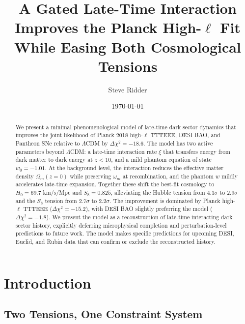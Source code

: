 \documentclass[twocolumn,showpacs,preprintnumbers,amsmath,amssymb,prd]{revtex4-2}
\begin{document}

\title{A Gated Late-Time Interaction Improves the Planck High-$\ell$ Fit While Easing Both Cosmological Tensions}

\author{Steve Ridder}

\date{\today}

\begin{abstract}
We present a minimal phenomenological model of late-time dark sector dynamics that improves the joint likelihood of Planck 2018 high-$\ell$ TTTEEE, DESI BAO, and Pantheon SNe relative to $\Lambda$CDM by $\Delta\chi^2 = -18.6$. The model has two active parameters beyond $\Lambda$CDM: a late-time interaction rate $\xi$ that transfers energy from dark matter to dark energy at $z < 10$, and a mild phantom equation of state $w_0 = -1.01$. At the background level, the interaction reduces the effective matter density $\Omega_m(z=0)$ while preserving $\omega_m$ at recombination, and the phantom $w$ mildly accelerates late-time expansion. Together these shift the best-fit cosmology to $H_0 = 69.7$ km/s/Mpc and $S_8 = 0.825$, alleviating the Hubble tension from $4.1\sigma$ to $2.9\sigma$ and the $S_8$ tension from $2.7\sigma$ to $2.2\sigma$. The improvement is dominated by Planck high-$\ell$ TTTEEE ($\Delta\chi^2 = -15.2$), with DESI BAO slightly preferring the model ($\Delta\chi^2 = -1.8$). We present the model as a reconstruction of late-time interacting dark sector history, explicitly deferring microphysical completion and perturbation-level predictions to future work. The model makes specific predictions for upcoming DESI, Euclid, and Rubin data that can confirm or exclude the reconstructed history.
\end{abstract}

\maketitle

\section{Introduction}
\label{sec:intro}

\subsection{Two Tensions, One Constraint System}
\end{document}
